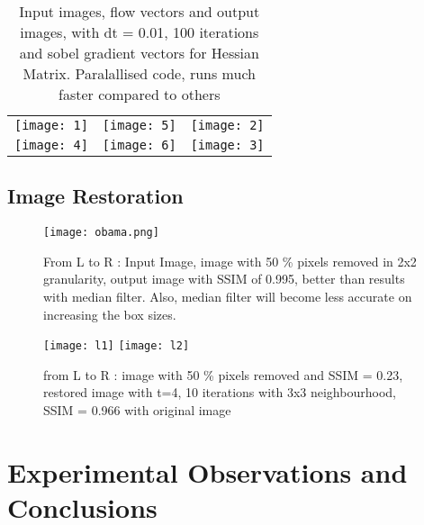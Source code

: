 \documentclass[a4paper]{article}
\begin{document}
\begin{table}[H]
\caption{Input images, flow vectors and output images, with dt = 0.01, 100 iterations and sobel gradient vectors for Hessian Matrix. Paralallised code, runs much faster compared to others}
\begin{tabular}{c c c}
\texttt{[image: 1]} & \texttt{[image: 5]} & 
\texttt{[image: 2]}\\
\texttt{[image: 4]} & \texttt{[image: 6]} &
\texttt{[image: 3]}
\end{tabular}
\end{table}

\subsection{Image Restoration}


\begin{figure}[H]
\centering
\texttt{[image: obama.png]}
\caption{\label{fig:data}
    From L to R : Input Image, image with 50 \% pixels removed in 2x2 granularity, output image with SSIM of 0.995, better than results with median filter. Also, median filter will become less accurate on increasing the box sizes. }

\end{figure}

\begin{figure}[H] \label{frow}
 \begin{floatrow} 
 {\texttt{[image: l1]}}
 {\texttt{[image: l2]}}
 \end{floatrow}
 \caption{\label{fig:data} from L to R : image with 50 \% pixels removed and SSIM = 0.23, restored image with t=4, 10 iterations with 3x3 neighbourhood, SSIM = 0.966 with original image}
\end{figure}




\section{Experimental Observations and Conclusions}
\end{document}
